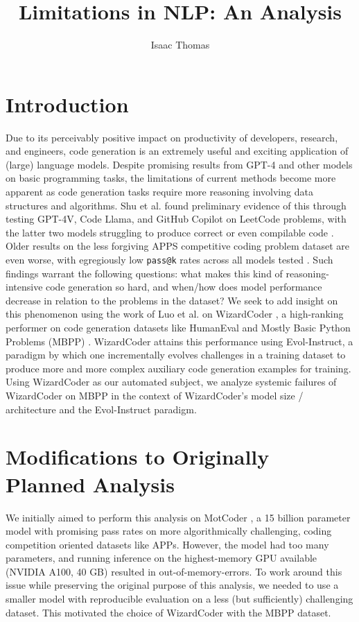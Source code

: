 \documentclass[10pt]{article}
\title{Limitations in NLP: An Analysis}
\author{Isaac Thomas}
\newcommand{\code}[1]{\texttt{#1}}
\theoremstyle{definition}
\begin{document}
\maketitle
\section{Introduction}
\noindent Due to its perceivably positive impact on productivity of developers, research, and engineers, code generation is an extremely useful and exciting application of (large) language models. Despite promising results from GPT-4 \cite{gpt4} and other models on basic programming tasks, the limitations of current methods become more apparent as code generation tasks require more reasoning involving data structures and algorithms. Shu et al. found preliminary evidence of this through testing GPT-4V, Code Llama, and GitHub Copilot on LeetCode problems, with the latter two models struggling to produce correct or even compilable code \cite{llmeval1}. Older results on the less forgiving APPS competitive coding problem dataset are even worse, with egregiously low \code{pass@k} rates across all models tested \cite{paperswithcode}. Such findings warrant the following questions: what makes this kind of reasoning-intensive code generation so hard, and when/how does model performance decrease in relation to the problems in the dataset? We seek to add insight on this phenomenon using the work of Luo et al. on WizardCoder \cite{wizardcoder}, a high-ranking performer on code generation datasets like HumanEval \cite{humaneval} and Mostly Basic Python Problems (MBPP) \cite{mbpp}. WizardCoder attains this performance using Evol-Instruct, a paradigm by which one incrementally evolves challenges in a training dataset to produce more and more complex auxiliary code generation examples for training. Using WizardCoder as our automated subject, we analyze systemic failures of WizardCoder on MBPP in the context of WizardCoder's model size / architecture and the Evol-Instruct paradigm.

\section{Modifications to Originally Planned Analysis}
\noindent We initially aimed to perform this analysis on MotCoder \cite{motcoder}, a 15 billion parameter model with promising pass rates on more algorithmically challenging, coding competition oriented datasets like APPs. However, the model had too many parameters, and running inference on the highest-memory GPU available (NVIDIA A100, 40 GB) resulted in out-of-memory-errors. To work around this issue while preserving the original purpose of this analysis, we needed to use a smaller model with reproducible evaluation on a less (but sufficiently) challenging dataset. This motivated the choice of WizardCoder with the MBPP dataset.
\end{document}
